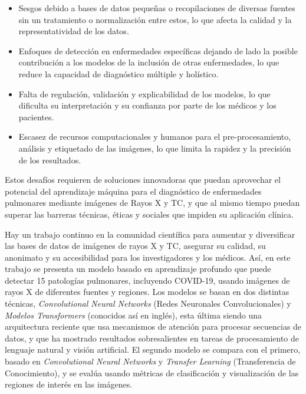 \begin{itemize}
      \item Sesgos debido a bases de datos pequeñas o recopilaciones de diversas fuentes sin un
            tratamiento o normalización entre estos, lo que afecta la calidad y la representatividad
            de los datos.
      \item Enfoques de detección en enfermedades específicas dejando de lado la posible contribución
            a los modelos de la inclusión de otras enfermedades, lo que reduce la capacidad de
            diagnóstico múltiple y holístico.
      \item Falta de regulación, validación y explicabilidad de los modelos, lo que dificulta su
            interpretación y su confianza por parte de los médicos y los pacientes.
      \item Escasez de recursos computacionales y humanos para el pre-procesamiento, análisis y
            etiquetado de las imágenes, lo que limita la rapidez y la precisión de los resultados.
\end{itemize}

Estos desafíos requieren de soluciones innovadoras que puedan aprovechar el potencial del
aprendizaje máquina para el diagnóstico de enfermedades pulmonares mediante imágenes de Rayos X y TC,
y que al mismo tiempo puedan superar las barreras técnicas, éticas y sociales que impiden su
aplicación clínica.

Hay un trabajo continuo en la comunidad científica para aumentar y diversificar las bases de datos
de imágenes de rayos X y TC, asegurar su calidad, su anonimato y su accesibilidad para los
investigadores y los médicos. Así, en este trabajo se presenta un modelo basado en aprendizaje
profundo que puede detectar 15 patologías pulmonares, incluyendo COVID-19, usando imágenes de rayos
X de diferentes fuentes y regiones.
Los modelos se basan en dos distintas técnicas, \textit{Convolutional Neural Networks} (Redes
Neuronales Convolucionales) y \textit{Modelos Transformers} (conocidos así en inglés),
esta última siendo una arquitectura reciente que usa mecanismos de atención para procesar secuencias
de datos, y que ha mostrado resultados sobresalientes en tareas de procesamiento de lenguaje natural
y visión artificial. El segundo modelo se compara con el primero, basado en \textit{Convolutional Neural Networks}
y \textit{Transfer Learning} (Transferencia de Conocimiento), y se evalúa usando métricas de
clasificación y visualización de las regiones de interés en las imágenes.


